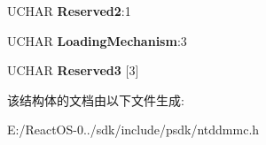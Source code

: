 \begin{DoxyCompactItemize}
\mbox{\label{struct___f_e_a_t_u_r_e___d_a_t_a___r_e_m_o_v_a_b_l_e___m_e_d_i_u_m_a3e6bf38555f67ff8179e00be67a8ba60}} 
U\+C\+H\+AR {\bfseries Reserved2}\+:1
\item 
\mbox{\label{struct___f_e_a_t_u_r_e___d_a_t_a___r_e_m_o_v_a_b_l_e___m_e_d_i_u_m_a65386abb3dc1c9e750c4a477b018142a}} 
U\+C\+H\+AR {\bfseries Loading\+Mechanism}\+:3
\item 
\mbox{\label{struct___f_e_a_t_u_r_e___d_a_t_a___r_e_m_o_v_a_b_l_e___m_e_d_i_u_m_a1232249cb1747be26caafe9fc41f805f}} 
U\+C\+H\+AR {\bfseries Reserved3} \mbox{[}3\mbox{]}
\end{DoxyCompactItemize}


该结构体的文档由以下文件生成\+:\begin{DoxyCompactItemize}
\item 
E\+:/\+React\+O\+S-\/0../sdk/include/psdk/ntddmmc.\+h\end{DoxyCompactItemize}
